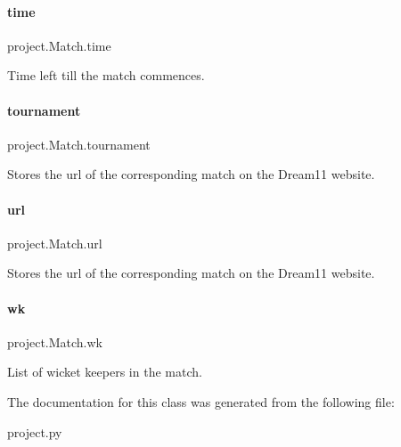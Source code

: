 \paragraph{\texorpdfstring{time}{time}}
{\footnotesize\ttfamily project.\+Match.\+time}



Time left till the match commences. 

\mbox{\label{classproject_1_1Match_ac377f100bd078655a754762297731e8a}} 
\paragraph{\texorpdfstring{tournament}{tournament}}
{\footnotesize\ttfamily project.\+Match.\+tournament}



Stores the url of the corresponding match on the Dream11 website. 

\mbox{\label{classproject_1_1Match_aeac700e0377708bc3d768f572544ab5e}} 
\paragraph{\texorpdfstring{url}{url}}
{\footnotesize\ttfamily project.\+Match.\+url}



Stores the url of the corresponding match on the Dream11 website. 

\mbox{\label{classproject_1_1Match_aaed99cf294a0dc51d89caccf11307842}} 
\paragraph{\texorpdfstring{wk}{wk}}
{\footnotesize\ttfamily project.\+Match.\+wk}



List of wicket keepers in the match. 



The documentation for this class was generated from the following file\+:\begin{DoxyCompactItemize}
\item 
project.\+py\end{DoxyCompactItemize}
